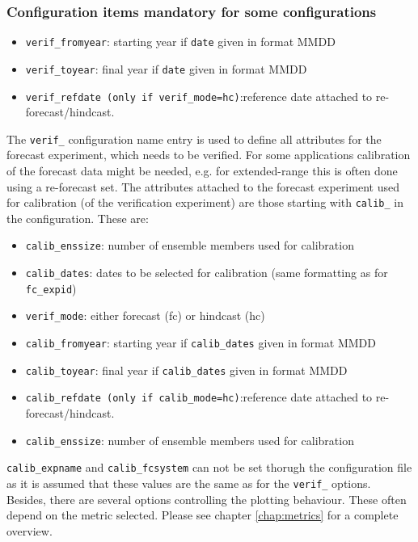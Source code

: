 \documentclass[DIV=10, parskip=full]{scrreprt}
\begin{document}
\subsubsection{Configuration items mandatory for some configurations}
\begin{itemize}
	\item \texttt{verif\_fromyear}: starting year if \texttt{date} given in format MMDD
	\item \texttt{verif\_toyear}: final year if \texttt{date} given in format MMDD
	\item \texttt{verif\_refdate (only if \texttt{verif\_mode=hc})}:reference date attached to re-forecast/hindcast. 
\end{itemize}
The \texttt{verif\_} configuration name entry is used to define all attributes for the forecast experiment, which needs to be verified. For some applications calibration of the forecast data might be needed, e.g. for extended-range this is often done using a re-forecast set. The attributes attached to the forecast experiment used for calibration (of the verification experiment) are those starting with  \texttt{calib\_} in the configuration. These are:
\begin{itemize}
	\item \texttt{calib\_enssize}: number of ensemble members used for calibration 
	\item \texttt{calib\_dates}: dates to be selected for calibration (same formatting as for \texttt{fc\_expid})
	\item \texttt{verif\_mode}: either forecast (fc) or hindcast (hc)
	\item \texttt{calib\_fromyear}: starting year if \texttt{calib\_dates} given in format MMDD
	\item \texttt{calib\_toyear}: final year if \texttt{calib\_dates} given in format MMDD
	\item \texttt{calib\_refdate (only if \texttt{calib\_mode=hc})}:reference date attached to re-forecast/hindcast. 
	\item \texttt{calib\_enssize}: number of ensemble members used for calibration 
\end{itemize}

\texttt{calib\_expname} and \texttt{calib\_fcsystem} can not be set thorugh the configuration file as it is assumed that these values are the same as for the \texttt{verif\_} options. Besides, there are several options controlling the plotting behaviour. These often depend on the metric selected. Please see chapter \ref{chap:metrics} for a complete overview.
\end{document}
